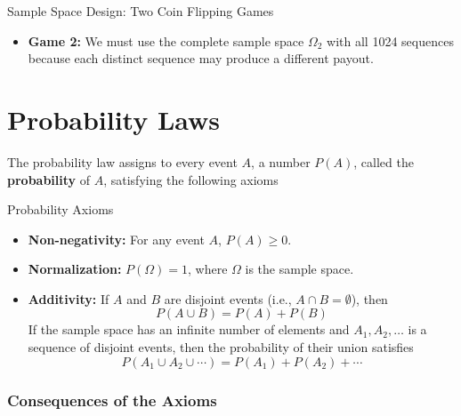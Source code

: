 \begin{itemize}
\begin{exampleboxbreak}{Sample Space Design: Two Coin Flipping Games}
\begin{itemize}
    \item \textbf{Game 2:} We must use the complete sample space $\Omega_2$ with all 1024 sequences because each distinct sequence may produce a different payout.
\end{itemize}
\end{exampleboxbreak}
\section{Probability Laws}
The probability law assigns to every event \(A\), a number \(P(A)\), called the \textbf{probability} of \(A\), satisfying the following axioms 

\begin{axiomboxbreak}{Probability Axioms}
    \begin{itemize}
        \item \textbf{Non-negativity:} For any event \(A\), \(P(A) \geq 0\).
        \item \textbf{Normalization:} \(P(\Omega) = 1\), where \(\Omega\) is the sample space.
        \item \textbf{Additivity:} If \(A\) and \(B\) are disjoint events (i.e., \(A \cap B = \emptyset\)), then 
        \[ P(A \cup B) = P(A) + P(B)\]
        If the sample space has an infinite number of elements
and \(A_1, A_2, \ldots\) is a sequence of disjoint events, then the probability of
their union satisfies
\[ P(A_1 \cup A_2 \cup \cdots) = P(A_1) + P(A_2) + \cdots \]
    \end{itemize}
\end{axiomboxbreak}
\subsubsection{Consequences of the Axioms}


\end{itemize}
